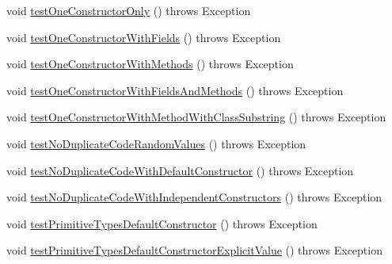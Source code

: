 \begin{DoxyCompactItemize}
\item 
void \hyperlink{classedu_1_1illinois_1_1canistelCassabanana_1_1tests_1_1RemoveDuplicateCodeInConstructorsRefactoringTests_a0683dc3fda87c48eb477162a3b3f14d9}{testOneConstructorOnly} ()  throws Exception 
\item 
void \hyperlink{classedu_1_1illinois_1_1canistelCassabanana_1_1tests_1_1RemoveDuplicateCodeInConstructorsRefactoringTests_a7a9ac5ccebf5cf024a700db74ca35cc3}{testOneConstructorWithFields} ()  throws Exception 
\item 
void \hyperlink{classedu_1_1illinois_1_1canistelCassabanana_1_1tests_1_1RemoveDuplicateCodeInConstructorsRefactoringTests_ac147b57ed8e9f558920574a84743ddbe}{testOneConstructorWithMethods} ()  throws Exception 
\item 
void \hyperlink{classedu_1_1illinois_1_1canistelCassabanana_1_1tests_1_1RemoveDuplicateCodeInConstructorsRefactoringTests_ad5d877a8c45fc76e2a8ab72b78667a8d}{testOneConstructorWithFieldsAndMethods} ()  throws Exception 
\item 
void \hyperlink{classedu_1_1illinois_1_1canistelCassabanana_1_1tests_1_1RemoveDuplicateCodeInConstructorsRefactoringTests_ab518ec5a01967ba387d226705620c2ce}{testOneConstructorWithMethodWithClassSubstring} ()  throws Exception 
\item 
void \hyperlink{classedu_1_1illinois_1_1canistelCassabanana_1_1tests_1_1RemoveDuplicateCodeInConstructorsRefactoringTests_ab7ed0630acbbb01b36e84e060a282193}{testNoDuplicateCodeRandomValues} ()  throws Exception 
\item 
void \hyperlink{classedu_1_1illinois_1_1canistelCassabanana_1_1tests_1_1RemoveDuplicateCodeInConstructorsRefactoringTests_ab173b5c78a3860d95f4ab97fdc0fef49}{testNoDuplicateCodeWithDefaultConstructor} ()  throws Exception 
\item 
void \hyperlink{classedu_1_1illinois_1_1canistelCassabanana_1_1tests_1_1RemoveDuplicateCodeInConstructorsRefactoringTests_a65fcb17a4c0e1fb24ce9bd210883a678}{testNoDuplicateCodeWithIndependentConstructors} ()  throws Exception 
\item 
void \hyperlink{classedu_1_1illinois_1_1canistelCassabanana_1_1tests_1_1RemoveDuplicateCodeInConstructorsRefactoringTests_ab15dc29ef881c83085f3eb1011efc266}{testPrimitiveTypesDefaultConstructor} ()  throws Exception 
\item 
void \hyperlink{classedu_1_1illinois_1_1canistelCassabanana_1_1tests_1_1RemoveDuplicateCodeInConstructorsRefactoringTests_ad2d10c04ff25aeecd02e6dc405d157f2}{testPrimitiveTypesDefaultConstructorExplicitValue} ()  throws Exception 

\end{DoxyCompactItemize}
